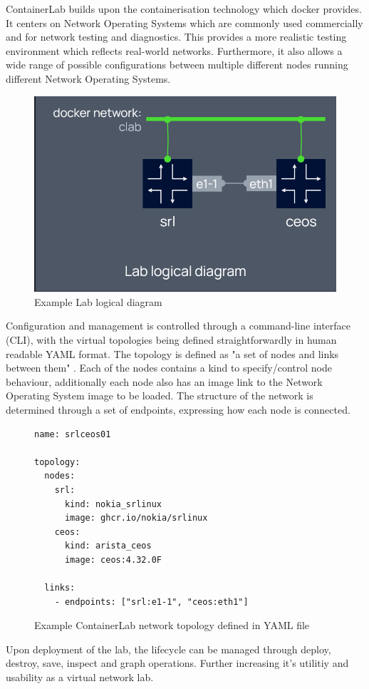 ContainerLab builds upon the containerisation technology which docker provides. It centers on Network Operating Systems which are commonly used commercially and for network testing and diagnostics. This provides a more realistic testing environment which reflects real-world networks. Furthermore, it also allows a wide range of possible configurations between multiple different nodes running different Network Operating Systems.

\begin{figure}
    \centering
    \includegraphics[width=0.5\linewidth]{images/lab_logical_diagram.png}
    \caption{Example Lab logical diagram \cite{containerlab}}
    \label{fig:lab_diagram_example}
\end{figure}

Configuration and management is controlled through a command-line interface (CLI), with the virtual topologies being defined straightforwardly in human readable YAML format. The topology is defined as "a set of nodes and links between them" \cite{containerlab}. Each of the nodes contains a kind to specify/control node behaviour, additionally each node also has an image link to the Network Operating System image to be loaded. The structure of the network is determined through a set of endpoints, expressing how each node is connected.

\begin{figure}
    \centering
    \begin{lstlisting}
name: srlceos01

topology:
  nodes:
    srl:
      kind: nokia_srlinux
      image: ghcr.io/nokia/srlinux
    ceos:
      kind: arista_ceos
      image: ceos:4.32.0F

  links:
    - endpoints: ["srl:e1-1", "ceos:eth1"]
\end{lstlisting}
    \caption{Example ContainerLab network topology defined in YAML file}
    \label{fig:topology_yml}
\end{figure}

Upon deployment of the lab, the lifecycle can be managed through deploy, destroy, save, inspect and graph operations. Further increasing it's utilitiy and usability as a virtual network lab.

